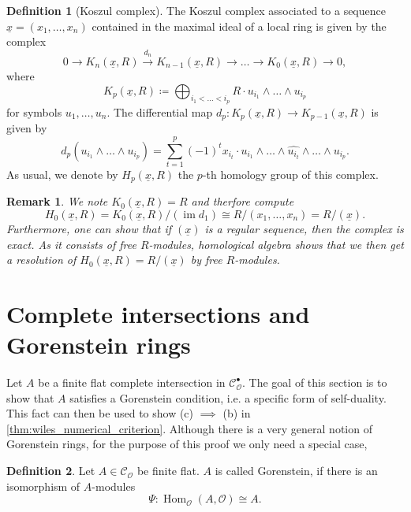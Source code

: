 \documentclass{article}
\theoremstyle{plain}%
\newtheorem{remark}{Remark}[section]
\theoremstyle{definition}
\newtheorem{definition}{Definition}[section]
\theoremstyle{remark}
\newcommand{\cob}{\mathcal{C}_\mathcal{O}^\bullet}
\newcommand{\co}{\mathcal{C}_\mathcal{O}}
\newcommand{\im}{\operatorname{im}}
\renewcommand{\hom}{\operatorname{Hom}}
\begin{document}
\begin{definition}[Koszul complex]\cites[ch. 5.3]{darmon1995fermat}[\S 16]{Matsumura1986}
    The Koszul complex associated to a sequence \(\underline{x} = (x_1, \dots, x_n)\) contained in the maximal ideal
    of a local ring is given by the complex
    \[
        0 \to K_n(\underline{x}, R) \xrightarrow{d_n} K_{n-1}(\underline{x}, R) \to \dots \to K_{0}(\underline{x},R) \to 0,
    \]
    where 
    \[
        K_p(\underline{x}, R) \coloneqq \bigoplus_{i_1 < \dots < i_p} R \cdot u_{i_1}\wedge\dots\wedge u_{i_p}
    \]
    for symbols \(u_1, \dots, u_n\). The differential map \(d_p\colon K_p(\underline{x}, R) \to K_{p-1}(\underline{x}, R)\)
    is given by
    \[
        d_p(u_{i_1}\wedge\dots\wedge u_{i_p}) = \sum_{t=1}^p(-1)^t x_{i_t} \cdot 
        u_{i_1} \wedge \dots \wedge \widehat{u_{i_t}}\wedge \dots \wedge u_{i_p}.
    \]
    As usual, we denote by \(H_p(\underline{x}, R)\) the \(p\)-th homology group of this complex.
\end{definition}

\begin{remark}\textup{\cites[proposition 5.13]{darmon1995fermat}[theorem 16.5 (i)]{Matsumura1986}}
    We note \(K_0(\underline{x}, R) = R\) and therfore compute
    \[
        H_0(\underline{x}, R) = K_0(\underline{x}, R)/(\im d_1) \cong R/(x_1, \dots, x_n) = R/(\underline{x}).
    \]
    Furthermore, one can show that if \((\underline{x})\) is a regular sequence, then the complex is exact.
    As it consists of free \(R\)-modules, homological algebra shows that we then get a resolution of
    \(H_0(\underline{x}, R) = R/(\underline{x})\) by free \(R\)-modules. 
\end{remark}

\section{Complete intersections and Gorenstein rings}
Let \(A\) be a finite flat complete intersection in \(\cob\). The goal of this section is to show that \(A\)
satisfies a Gorenstein condition, i.e. a specific form of self-duality.
This fact can then be used to show (c) \(\implies\) (b) in \cref{thm:wiles_numerical_criterion}.
Although there is a very general notion of Gorenstein rings, for
the purpose of this proof we only need a special case,
\begin{definition}
    Let \(A \in \co\) be finite flat. \(A\) is called Gorenstein, if there is an isomorphism of \(A\)-modules
    \[
        \Psi\colon \hom_\mathcal{O}(A, \mathcal{O}) \cong A.
    \]
\end{definition}
\end{document}
